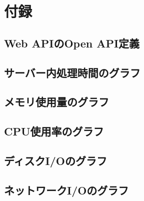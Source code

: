 \documentclass[../../main]{subfiles}
\begin{document}
    \section{付録}\label{sec:appendix}

    \subsection{Web APIのOpen API定義}\label{subsec:web-apiopen-api}
    
    \clearpage

    \subsection{サーバー内処理時間のグラフ}\label{subsec:server-time-graph}
    
    \clearpage

    \subsection{メモリ使用量のグラフ}\label{subsec:memory-graph}
    
    
    \clearpage

    \subsection{CPU使用率のグラフ}\label{subsec:cpu-graph}
    
    

    \clearpage

    \subsection{ディスクI/Oのグラフ}\label{subsection:disk-io-graph}
    
    
    
    
    \clearpage

    \subsection{ネットワークI/Oのグラフ}\label{subsection:net-io-graph}
    
    
    
    
    \clearpage
\end{document}
